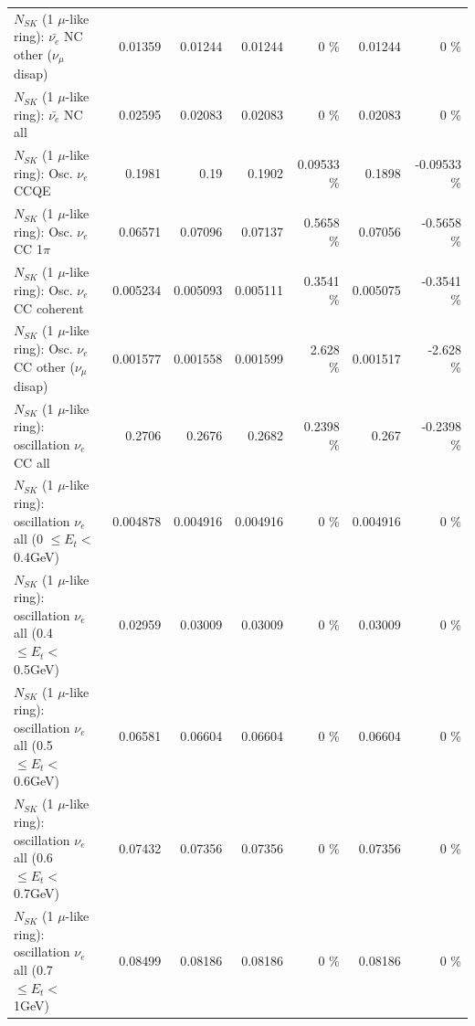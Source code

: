\begin{table}
\begin{tabular}{| l | r | r | r  r | r  r |}
          $N_{SK}$ (1 $\mu$-like ring): $\bar{\nu_e}$ NC other ($\nu_\mu$ disap) &         0.01359 &         0.01244 &         0.01244 &        0 \%  &         0.01244 &        0 \%  \\ 
                            $N_{SK}$ (1 $\mu$-like ring): $\bar{\nu_{e}}$ NC all &         0.02595 &         0.02083 &         0.02083 &        0 \%  &         0.02083 &        0 \%  \\ 
\hline
\hline
\hline
                                 $N_{SK}$ (1 $\mu$-like ring): Osc. $\nu_e$ CCQE &          0.1981 &            0.19 &          0.1902 &  0.09533 \%  &          0.1898 & -0.09533 \%  \\ 
                            $N_{SK}$ (1 $\mu$-like ring): Osc. $\nu_e$ CC 1$\pi$ &         0.06571 &         0.07096 &         0.07137 &   0.5658 \%  &         0.07056 &  -0.5658 \%  \\ 
                          $N_{SK}$ (1 $\mu$-like ring): Osc. $\nu_e$ CC coherent &        0.005234 &        0.005093 &        0.005111 &   0.3541 \%  &        0.005075 &  -0.3541 \%  \\ 
           $N_{SK}$ (1 $\mu$-like ring): Osc. $\nu_e$ CC other ($\nu_\mu$ disap) &        0.001577 &        0.001558 &        0.001599 &    2.628 \%  &        0.001517 &   -2.628 \%  \\ 
                        $N_{SK}$ (1 $\mu$-like ring): oscillation $\nu_e$ CC all &          0.2706 &          0.2676 &          0.2682 &   0.2398 \%  &           0.267 &  -0.2398 \%  \\ 
\hline
$N_{SK}$ (1 $\mu$-like ring): oscillation $\nu_{e}$ all (0 $\leq E_{t} <$ 0.4GeV) &        0.004878 &        0.004916 &        0.004916 &        0 \%  &        0.004916 &        0 \%  \\ 
$N_{SK}$ (1 $\mu$-like ring): oscillation $\nu_{e}$ all (0.4 $\leq E_{t} <$ 0.5GeV) &         0.02959 &         0.03009 &         0.03009 &        0 \%  &         0.03009 &        0 \%  \\ 
$N_{SK}$ (1 $\mu$-like ring): oscillation $\nu_{e}$ all (0.5 $\leq E_{t} <$ 0.6GeV) &         0.06581 &         0.06604 &         0.06604 &        0 \%  &         0.06604 &        0 \%  \\ 
$N_{SK}$ (1 $\mu$-like ring): oscillation $\nu_{e}$ all (0.6 $\leq E_{t} <$ 0.7GeV) &         0.07432 &         0.07356 &         0.07356 &        0 \%  &         0.07356 &        0 \%  \\ 
$N_{SK}$ (1 $\mu$-like ring): oscillation $\nu_{e}$ all (0.7 $\leq E_{t} <$ 1GeV) &         0.08499 &         0.08186 &         0.08186 &        0 \%  &         0.08186 &        0 \%  \\ 

\end{tabular}
\end{table}

